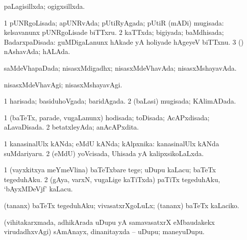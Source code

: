 {\bentry
{} 
\gl{\gu}
\expl{}
\bmng
 paLagisillxda; ogigxsillxda. 
\emng
\eentry

\bentry
{} 
\gl{\gu}
\bmng
\bnum
\num{1} pUNRgoLisada; apUNRvAda; pUtiRyAgada; pUtiR (mADi) mugisada:  kelsavanunx pUNRgoLisade biTTxru. 
\num{2} kaTTxda; bigiyada; baMdhisada; BadarxpaDisada:  guMDigaLanunx hAkade yA holiyade hAgeyeV biTTxnu. 
\num{3} (\pArxparx) nAshavAda; hALAda. 
\enum
\emng
\eentry

\bentry
{} 
\gl{\gu}
\expl{}
\bmng
\emng
\eentry

\bentry
{} 
\gl{\gu}
\expl{}
\bmng
 saMdeVhapaDada; nisasxMdigadhx; nisasxMdeVhavAda; nisasxMshayavAda. 
\emng
\eentry

\bentry
{} 
\gl{\kirxvi}
\expl{}
\bmng
 nisasxMdeVhavAgi; nisasxMshayavAgi. 
\emng
\eentry

\bentry
{} 
\gl{\gu}
\expl{}
\bmng
\bnum
\num{1} harisada; basiduhoVgada; baridAgada. 
\num{2} (baLasi) mugisada; KAlimADada. 
\enum
\emng
\eentry

\bentry
{} 
\gl{\gu}
\expl{}
\bmng
\bnum
\num{1} (baTeTx, parade, \mo vugaLanunx) hodisada; toDisada; AcAPxdisada; aLavaDisada. 
\num{2} betatxleyAda; anAcAPxdita. 
\enum
\emng
\eentry

\bentry
{} 
\gl{\gu}
\expl{}
\bmng
\bnum
\num{1} kanasinalUlx kANda; eMdU kANda; kAlpxnika:  kanasinalUlx kANda suMdariyaru. 
\num{2} (eMdU) yoVcisada, Uhisada yA kalipxsikoLaLxda. 
\enum
\emng
\eentry

\bentry
{} 
\gl{\gu}
\expl{}
\bmng
\emng
\eentry

\bentry
{} 
\gl{\sakirx}
\expl{}
\bmng
\bnum
\num{1} (vayxkitxya meYmeVlina) baTeTxbare tege; uDupu kaLacu; baTeTx tegeduhAku. 
\num{2} (gAya, varxN, \mo vugaLige kaTiTxda) paTiTx tegeduhAku, `bAyxMDeVjf' kaLacu. 
\enum
\emng

\noindent
\gl{\akirx}
\expl{}
\bmng
(tananx) baTeTx tegeduhAku; vivasatxrXgoLuLx; (tananx) baTeTx kaLaciko. 
\emng
\eentry

\bentry
{} 
\gl{\nA}
\expl{}
\bmng
 (vihitakarxmada, adhikArada uDupu yA samavasatxrX eMbaudakekx virudadhxvAgi) sAmAnayx, dinanitayxda -- uDupu; maneyuDupu. 
\emng
\eentry

}
